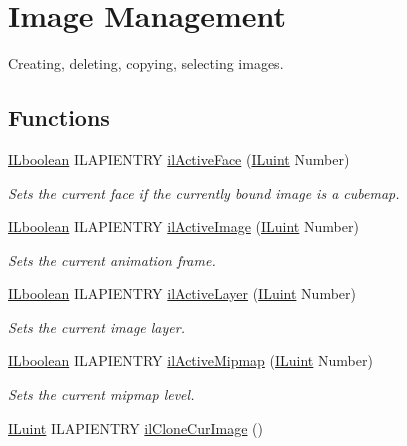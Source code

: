 \hypertarget{group__image__mgt}{\section{Image Management}
\label{group__image__mgt}
}


Creating, deleting, copying, selecting images.  


\subsection*{Functions}
\begin{DoxyCompactItemize}
\item 
\hyperlink{group__il__types_gaa6aa7c95cfdc06b4d8601ef832b7bb0a}{I\+Lboolean} I\+L\+A\+P\+I\+E\+N\+T\+R\+Y \hyperlink{group__image__mgt_ga77651f86dfb248dddfead0c095ed2c12}{il\+Active\+Face} (\hyperlink{group__il__types_gaff8e86a1072c8d7cfe387fb87c6ed8e1}{I\+Luint} Number)
\begin{DoxyCompactList}\small\item\em Sets the current face if the currently bound image is a cubemap. \end{DoxyCompactList}\item 
\hyperlink{group__il__types_gaa6aa7c95cfdc06b4d8601ef832b7bb0a}{I\+Lboolean} I\+L\+A\+P\+I\+E\+N\+T\+R\+Y \hyperlink{group__image__mgt_ga1ea5b35280be4128de20e7218108d669}{il\+Active\+Image} (\hyperlink{group__il__types_gaff8e86a1072c8d7cfe387fb87c6ed8e1}{I\+Luint} Number)
\begin{DoxyCompactList}\small\item\em Sets the current animation frame. \end{DoxyCompactList}\item 
\hyperlink{group__il__types_gaa6aa7c95cfdc06b4d8601ef832b7bb0a}{I\+Lboolean} I\+L\+A\+P\+I\+E\+N\+T\+R\+Y \hyperlink{group__image__mgt_gad362b9264fd40f787f2748237b214f96}{il\+Active\+Layer} (\hyperlink{group__il__types_gaff8e86a1072c8d7cfe387fb87c6ed8e1}{I\+Luint} Number)
\begin{DoxyCompactList}\small\item\em Sets the current image layer. \end{DoxyCompactList}\item 
\hyperlink{group__il__types_gaa6aa7c95cfdc06b4d8601ef832b7bb0a}{I\+Lboolean} I\+L\+A\+P\+I\+E\+N\+T\+R\+Y \hyperlink{group__image__mgt_ga02171eee15fcaf5fb1d1741307e7f8bc}{il\+Active\+Mipmap} (\hyperlink{group__il__types_gaff8e86a1072c8d7cfe387fb87c6ed8e1}{I\+Luint} Number)
\begin{DoxyCompactList}\small\item\em Sets the current mipmap level. \end{DoxyCompactList}\item 
\hypertarget{group__image__mgt_gae0771d03e54685b692b1103a1b29f80c}{\hyperlink{group__il__types_gaff8e86a1072c8d7cfe387fb87c6ed8e1}{I\+Luint} I\+L\+A\+P\+I\+E\+N\+T\+R\+Y \hyperlink{group__image__mgt_gae0771d03e54685b692b1103a1b29f80c}{il\+Clone\+Cur\+Image} ()}\label{group__image__mgt_gae0771d03e54685b692b1103a1b29f80c}


\end{DoxyCompactItemize}

